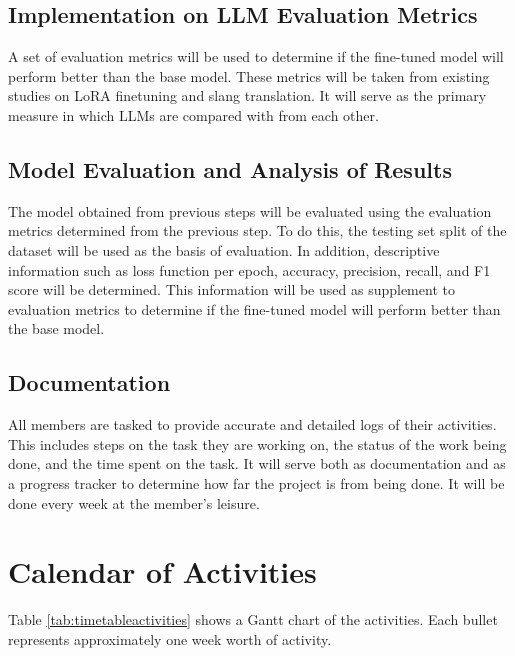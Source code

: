 \subsection{Implementation on LLM Evaluation Metrics}
A set of evaluation metrics will be used to determine if the fine-tuned model will perform better than the base model.
These metrics will be taken from existing studies on LoRA finetuning and slang translation.
It will serve as the primary measure in which LLMs are compared with from each other.

\subsection{Model Evaluation and Analysis of Results}
The model obtained from previous steps will be evaluated using the evaluation metrics determined from the previous step.
To do this, the testing set split of the dataset will be used as the basis of evaluation.
In addition, descriptive information such as loss function per epoch, accuracy, precision, recall, and F1 score will be determined.
This information will be used as supplement to evaluation metrics to determine if the fine-tuned model will perform better than the base model.

\subsection{Documentation}
All members are tasked to provide accurate and detailed logs of their activities.
This includes steps on the task they are working on, the status of the work being done, and the time spent on the task.
It will serve both as documentation and as a progress tracker to determine how far the project is from being done.
It will be done every week at the member’s leisure.


\section{Calendar of Activities}

	Table \ref{tab:timetableactivities} shows a Gantt chart of the activities.  Each bullet represents approximately
	one week worth of activity.
	
	\newcommand{\weekone}{\textbullet}
	\newcommand{\weektwo}{\textbullet \textbullet}
	\newcommand{\weekthree}{\textbullet \textbullet \textbullet}
	\newcommand{\weekfour}{\textbullet \textbullet \textbullet \textbullet}
	
